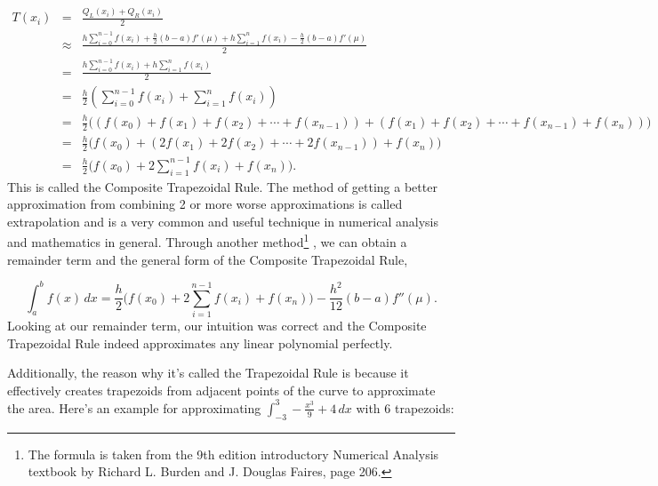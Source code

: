 \documentclass[12pt]{article}
\newcommand{\newLine}{\vspace{5mm}}
\newcommand{\integral}[3]{\text{$\int^{#2}_{#1} #3\,dx$}}
\newcommand{\summation}[3]{\text{$\sum^{#2}_{#1} #3$}}
\begin{document}
\begin{eqnarray*} T(x_i) &=& \frac{Q_L(x_i) + Q_R(x_i)}{2} \\
&\approx& \frac{h\summation{i = 0}{n - 1}{f(x_i)} + \frac{h}{2}(b-a)f'(\mu) + h\summation{i = 1}{n}{f(x_i)} - \frac{h}{2}(b-a)f'(\mu)}{2} \\
&=& \frac{h\summation{i = 0}{n - 1}{f(x_i)} + h\summation{i = 1}{n}{f(x_i)}}{2} \\
&=& \frac{h}{2}\left(\summation{i = 0}{n - 1}{f(x_i)} + \summation{i = 1}{n}{f(x_i)}\right) \\
&=& \frac{h}{2}\Big((f(x_0) + f(x_1) + f(x_2) + \cdots + f(x_{n-1})) + (f(x_1) + f(x_2) + \cdots + f(x_{n-1}) + f(x_n))\Big) \\
&=& \frac{h}{2}\Big(f(x_0) + (2f(x_1) + 2f(x_2) + \cdots + 2f(x_{n-1})) + f(x_n)\Big) \\
&=& \frac{h}{2}\Big(f(x_0) + 2\summation{i=1}{n-1}f(x_i) + f(x_n)\Big).
\end{eqnarray*}
This is called the Composite Trapezoidal Rule. The method of getting a better approximation from combining 2 or more worse approximations is called extrapolation and is a very common and useful technique in numerical analysis and mathematics in general. Through another method\footnote{The formula is taken from the 9th edition introductory Numerical Analysis textbook by Richard L. Burden and J. Douglas Faires, page 206.}
, we can obtain a remainder term and the general form of the Composite Trapezoidal Rule,

\begin{equation*} 
\integral{a}{b}{f(x)} = \frac{h}{2}\Big(f(x_0) + 2\summation{i = 1}{n-1}{f(x_i)} + f(x_n)\Big) - \frac{h^2}{12}(b-a)f''(\mu).
\end{equation*}
Looking at our remainder term, our intuition was correct and the Composite Trapezoidal Rule indeed approximates any linear polynomial perfectly.

\newLine Additionally, the reason why it's called the Trapezoidal Rule is because it effectively creates trapezoids from adjacent points of the curve to approximate the area. Here's an example for approximating $\integral{-3}{3}{-\frac{x^3}{9}+4}$ with 6 trapezoids:
\end{document}
